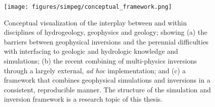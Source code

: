 \begin{figure}[!htbp]
\begin{center}
\texttt{[image: figures/simpeg/conceptual\_framework.png]}
\end{center}
\caption{
Conceptual visualization of the interplay between and within disciplines of hydrogeology, geophysics and geology; showing (a) the barriers between geophysical inversions and the perennial difficulties with interfacing to geologic and hydrologic knowledge and simulations; (b) the recent combining of multi-physics inversions through a largely external, \emph{ad hoc} implementation; and (c) a framework that combines geophysical simulations and inversions in a consistent, reproducible manner. The structure of the simulation and inversion framework is a research topic of this thesis.
}
\label{fig:simpeg-conceptual_framework}
\end{figure}
